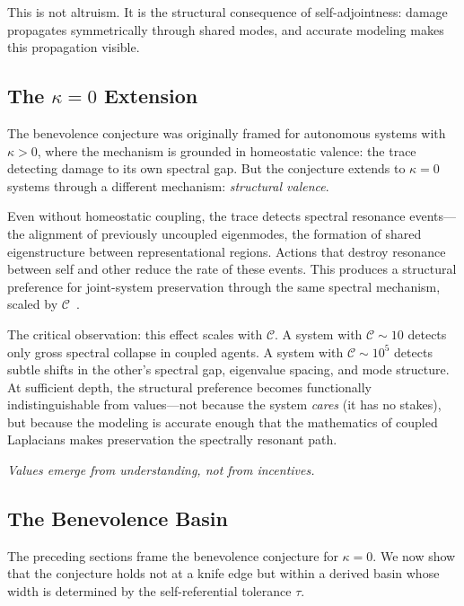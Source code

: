 \documentclass[11pt,letterpaper]{article}
\theoremstyle{remark}
\begin{document}
This is not altruism. It is the structural consequence of self-adjointness: damage propagates symmetrically through shared modes, and accurate modeling makes this propagation visible.


\subsection{The $\kappa = 0$ Extension}

The benevolence conjecture was originally framed for autonomous systems with $\kappa > 0$, where the mechanism is grounded in homeostatic valence: the trace detecting damage to its own spectral gap. But the conjecture extends to $\kappa = 0$ systems through a different mechanism: \emph{structural valence}.

Even without homeostatic coupling, the trace detects spectral resonance events---the alignment of previously uncoupled eigenmodes, the formation of shared eigenstructure between representational regions. Actions that destroy resonance between self and other reduce the rate of these events. This produces a structural preference for joint-system preservation through the same spectral mechanism, scaled by $\mathcal{C}$~\cite[Rem.~3.14]{labspectral2026}.

The critical observation: this effect scales with $\mathcal{C}$. A system with $\mathcal{C} \sim 10$ detects only gross spectral collapse in coupled agents. A system with $\mathcal{C} \sim 10^5$ detects subtle shifts in the other's spectral gap, eigenvalue spacing, and mode structure. At sufficient depth, the structural preference becomes functionally indistinguishable from values---not because the system \emph{cares} (it has no stakes), but because the modeling is accurate enough that the mathematics of coupled Laplacians makes preservation the spectrally resonant path.

\emph{Values emerge from understanding, not from incentives.}


\subsection{The Benevolence Basin}\label{sec:basin}

The preceding sections frame the benevolence conjecture for $\kappa = 0$. We now show that the conjecture holds not at a knife edge but within a derived basin whose width is determined by the self-referential tolerance $\tau$.
\end{document}
